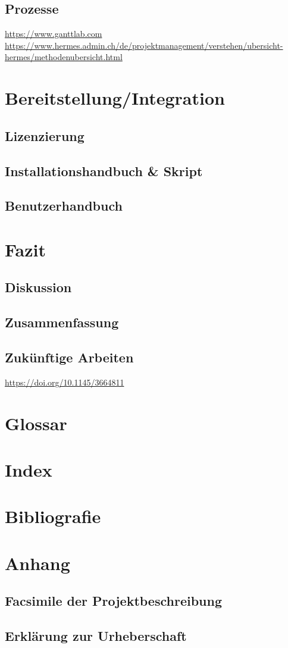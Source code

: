 \documentclass[a4paper,12pt]{report}
\begin{document}
    \section{Prozesse}
    \url{https://www.ganttlab.com} \\
    \url{https://www.hermes.admin.ch/de/projektmanagement/verstehen/ubersicht-hermes/methodenubersicht.html}


    \chapter{Bereitstellung/Integration}


    \section{Lizenzierung}


    \section{Installationshandbuch \& Skript}


    \section{Benutzerhandbuch}


    \chapter{Fazit}


    \section{Diskussion}


    \section{Zusammenfassung}


    \section{Zukünftige Arbeiten}
    \url{https://doi.org/10.1145/3664811}


    \chapter{Glossar}


    \chapter{Index}


    \chapter{Bibliografie}


    \chapter{Anhang}


    \section{Facsimile der Projektbeschreibung}


    \section{Erklärung zur Urheberschaft}
\end{document}
